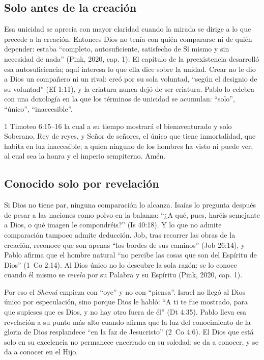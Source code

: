\subsection{Solo antes de la creación}

Esa unicidad se aprecia con mayor claridad cuando la mirada se dirige a lo que precede a la creación. Entonces Dios no tenía con quién compararse ni de quién depender: estaba ``completo, autosuficiente, satisfecho de Sí mismo y sin necesidad de nada'' (Pink, 2020, cap. 1). El capítulo de la preexistencia desarrolló esa autosuficiencia; aquí interesa lo que ella dice sobre la unidad. Crear no le dio a Dios un compañero ni un rival: creó por su sola voluntad, ``según el designio de su voluntad'' (Ef 1:11), y la criatura nunca dejó de ser criatura. Pablo lo celebra con una doxología en la que los términos de unicidad se acumulan: ``solo'', ``único'', ``inaccesible''.

\begin{verso}{1 Timoteo 6:15–16}
la cual a su tiempo mostrará el bienaventurado y solo Soberano, Rey de reyes, y Señor de señores, el único que tiene inmortalidad, que habita en luz inaccesible; a quien ninguno de los hombres ha visto ni puede ver, al cual sea la honra y el imperio sempiterno. Amén.
\end{verso}

\subsection{Conocido solo por revelación}

Si Dios no tiene par, ninguna comparación lo alcanza. Isaías lo pregunta después de pesar a las naciones como polvo en la balanza: ``¿A qué, pues, haréis semejante a Dios, o qué imagen le compondréis?'' (Is 40:18). Y lo que no admite comparación tampoco admite deducción. Job, tras recorrer las obras de la creación, reconoce que son apenas ``los bordes de sus caminos'' (Job 26:14), y Pablo afirma que el hombre natural ``no percibe las cosas que son del Espíritu de Dios'' (1~Co 2:14). Al Dios único no lo descubre la sola razón: se lo conoce cuando él mismo se \emph{revela} por su Palabra y su Espíritu (Pink, 2020, cap. 1).

Por eso el \emph{Shemá} empieza con ``oye'' y no con ``piensa''. Israel no llegó al Dios único por especulación, sino porque Dios le habló: ``A ti te fue mostrado, para que supieses que \SENOR{} es Dios, y no hay otro fuera de él'' (Dt 4:35). Pablo lleva esa revelación a su punto más alto cuando afirma que la luz del conocimiento de la gloria de Dios resplandece ``en la faz de Jesucristo'' (2~Co 4:6). El Dios que está solo en su excelencia no permanece encerrado en su soledad: se da a conocer, y se da a conocer en el Hijo.

